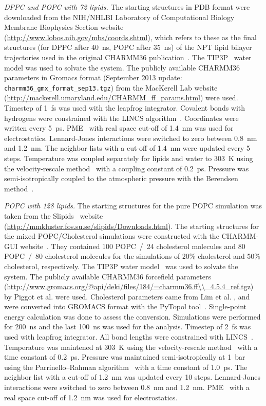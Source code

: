 \documentclass[journal=jacsat,manuscript=article]{achemso}
\begin{document}
{\it DPPC and POPC with 72 lipids.}
%
The starting structures in PDB format were downloaded from the
NIH/NHLBI Laboratory of Computational Biology Membrane Biophysics Section
website (\url{http://www.lobos.nih.gov/mbs/coords.shtml}),
which refers to these as the final structures (for DPPC after 40~ns, POPC after 35~ns)
of the NPT lipid bilayer trajectories used in the original CHARMM36 publication~\cite{klauda10}.
The TIP3P~\cite{jorgensen83} water model was used to solvate the system.
%
The publicly available CHARMM36 parameters in Gromacs format
(September 2013 update: {\tt charmm36\_gmx\_format\_sep13.tgz})
from the MacKerell Lab website
(\url{http://mackerell.umaryland.edu/CHARMM_ff_params.html}) were used.
Timestep of 1~fs was used with the leapfrog integrator. Covalent bonds with hydrogens were constrained with the LINCS algorithm~\cite{hess97,hess07}. 
Coordinates were written every 5~ps. PME~\cite{darden93,essman95} with real space cut-off of 1.4~nm was used 
for electrostatics. Lennard-Jones interactions were switched to zero between 0.8~nm and 1.2~nm.
The neighbor lists with a cut-off of 1.4~nm were updated every 5 steps. Temperature was coupled separately
for lipids and water to 303~K using the velocity-rescale method~\cite{bussi07} with a coupling constant of 0.2~ps.
Pressure was semi-isotropically coupled to the atmospheric pressure with the Berendsen method~\cite{berendsen84}.

{\it POPC with 128 lipids.}
The starting structures for the pure POPC simulation was taken from the Slipids~\cite{jambeck12b} website (\url{http://mmkluster.fos.su.se/slipids/Downloads.html}).
The starting structures for the mixed POPC/Cholesterol simulations were constructed with the CHARMM-GUI website~\cite{jo08}. 
They contained 100 POPC~/~24 cholesterol molecules and 80 POPC~/~80 cholesterol molecules for
the simulations of 20\% cholesterol and 50\% cholesterol, respectively. The TIP3P water model~\cite{jorgensen83} was used to
solvate the system.
The publicly available CHARMM36 forcefield parameters
(\url{http://www.gromacs.org/@api/deki/files/184/=charmm36.ff\\\_4.5.4\_ref.tgz}) 
by Piggot et al. \cite{piggot12} were used. Cholesterol parameters came
from Lim et al. \cite{lim12}, and were converted into GROMACS format with the PyTopol tool~\cite{salari15}.  
Single-point energy calculation was done to assess the conversion. 
Simulations were performed for 200~ns and the last 100~ns was used for the analysis. Timestep of 2~fs was
used with leapfrog integrator. All bond lengths were constrained with LINCS~\cite{hess97,hess07}. Temperature was maintened at
303~K using the velocity-rescale method~\cite{bussi07} with a time constant of 0.2~ps. Pressure was maintained semi-isotropically
at 1~bar using the Parrinello--Rahman algorithm~\cite{parrinello81} with a time constant of 1.0~ps. The neighbor list with a cut-off of 1.2~nm
was updated every 10 steps. Lennard-Jones interactions were switched to zero
between 0.8~nm and 1.2~nm. PME~\cite{darden93,essman95} with a real space cut-off of 1.2~nm was used for electrostatics.
\end{document}
